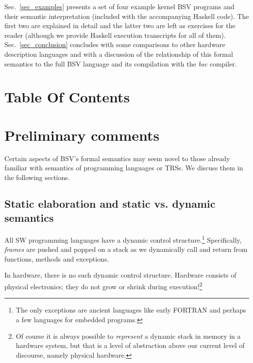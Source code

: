 \documentclass[11pt]{article}
\begin{document}
Sec.~\ref{sec_examples} presents a set of four example kernel BSV
programs and their semantic interpretation (included with the
accompanying Haskell code).  The first two are explained in detail and
the latter two are left as exercises for the reader (although we
provide Haskell execution transcripts for all of them).
Sec.~\ref{sec_conclusion} concludes with some comparisons to other
hardware description languages and with a discussion of the
relationship of this formal semantics to the full BSV language and its
compilation with the \emph{bsc} compiler.


\renewcommand*{\contentsname}{}

\section{Table Of Contents}

\tableofcontents

\hspace*{1em}


\section{Preliminary comments}

\label{sec_prelims}

Certain aspects of BSV's formal semantics may seem novel to those
already familiar with semantics of programming languages or TRSs.  We
discuss them in the following sections.


\subsection{Static elaboration and static vs. dynamic semantics}

All SW programming languages have a dynamic control
structure.\footnote{The only exceptions are ancient languages like
early FORTRAN and perhaps a few languages for embedded programs.}
Specifically, \emph{frames} are pushed and popped on a stack as we
dynamically call and return from functions, methods and exceptions.

In hardware, there is no such dynamic control structure.  Hardware
consists of physical electronics; they do not grow or shrink during
execution!\footnote{Of course it is always possible to
\emph{represent} a dynamic stack in memory in a hardware system, but
that is a level of abstraction above our current level of discourse,
namely physical hardware.}
\end{document}
